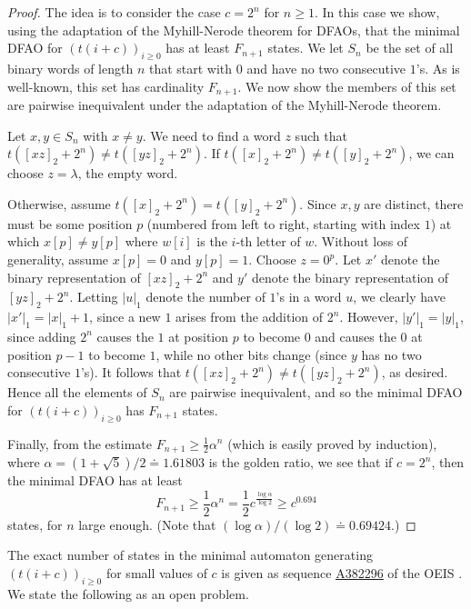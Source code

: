 \documentclass[12pt,reqno]{article}
\newcommand{\seqnum}[1]{\href{https://oeis.org/#1}{\rm \underline{#1}}}
\begin{document}
\begin{proof}
The idea is to consider the case $c = 2^n$ for $n \geq 1$.  In this case we 
show, using the adaptation of the Myhill-Nerode theorem for DFAOs,
that the minimal DFAO for $(t(i+c))_{i\geq 0}$ has at least $F_{n+1}$ states.
We let $S_n$ be the set of all binary words of length $n$
that start with $0$ and have no two consecutive $1$'s.  As is well-known,
this set has cardinality $F_{n+1}$.  We now show the members of this
set are pairwise inequivalent under the adaptation of the Myhill-Nerode theorem.  

Let $x,y \in S_n$ with $x \not= y$. We need to find a word $z$ 
such that $t([xz]_2 + 2^n) \not= t([yz]_2 + 2^n)$.
If $t([x]_2+2^n) \not= t([y]_2+2^n)$, we can choose $z = \lambda$, the
empty word.

Otherwise, assume $t([x]_2+2^n)=t([y]_2+2^n)$.
Since $x, y$ are distinct, there must be
some position $p$ (numbered from left to right, starting with index $1$)
at which $x[p] \not= y[p]$ where $w[i]$ is the $i$-th letter of $w$.  Without loss of generality, assume $x[p]=0$
and $y[p] = 1$.  Choose $z = 0^p$.  
Let $x'$ denote the binary representation of $[xz]_2 + 2^n$
and $y'$ denote the binary representation of $[yz]_2 + 2^n$.
Letting $|u|_1$ denote the number of $1$'s in a word $u$, we
clearly have $|x'|_1 = |x|_1 +1$, since a new $1$
arises from the addition of $2^n$.
However, $|y'|_1 = |y|_1$, since adding $2^n$ causes the $1$ at
position $p$ to become
$0$ and causes the $0$ at position
$p-1$ to become $1$, while no other bits 
change (since $y$ has no two consecutive $1$'s).
It follows that $t([xz]_2 + 2^n) \not= t([yz]_2 + 2^n)$, as desired.
Hence all the elements of $S_n$ are pairwise inequivalent, and so
the minimal DFAO for $(t(i+c))_{i \geq 0}$ has $F_{n+1}$ states.

Finally, from the estimate $F_{n+1} \geq \frac{1}{2}\alpha^n$
(which is easily proved by induction), where
$\alpha = (1+\sqrt{5})/2 \doteq 1.61803$ is the golden ratio,
we see that if $c = 2^n$, then the minimal DFAO has
at least 
$$F_{n+1} \geq \frac{1}{2} \alpha^n = \frac{1}{2} c^{\frac{\log \alpha}{\log 2}} \geq c^{0.694} $$
states, for $n$ large enough.
(Note that $(\log \alpha)/(\log 2) \doteq 0.69424$.)
\end{proof}


The exact number of states in the minimal automaton generating $(t(i+c))_{i \geq 0}$ for small values
of $c$ is given as sequence \seqnum{A382296} of the OEIS \cite{oeis_2025}. We state the following as an open problem.
\end{document}
